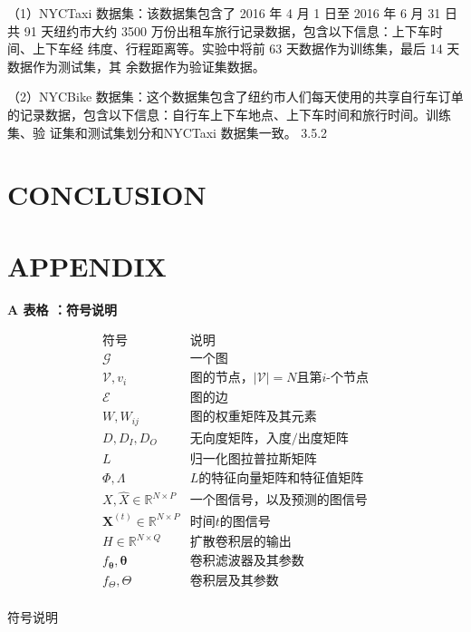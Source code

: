 \documentclass[10.5pt,compsoc,UTF8]{CjC}
\theoremstyle{mystyle}
\begin{document}
（1）NYCTaxi 数据集：该数据集包含了 2016 年 4 月 1 日至 2016 年 6 月 31 日共 91
天纽约市大约 3500 万份出租车旅行记录数据，包含以下信息：上下车时间、上下车经 纬度、行程距离等。实验中将前 63 天数据作为训练集，最后 14 天数据作为测试集，其 余数据作为验证集数据。 

（2）NYCBike 数据集：这个数据集包含了纽约市人们每天使用的共享自行车订单
的记录数据，包含以下信息：自行车上下车地点、上下车时间和旅行时间。训练集、验 证集和测试集划分和NYCTaxi 数据集一致。
3.5.2




\section{CONCLUSION}


\section{APPENDIX}

\textbf{ A 表格 ：符号说明 }\\
\begin{table}[h]
	\centering
	\[
	\begin{array}{l|l}
		\text{符号} & \text{说明} \\
		\hline \hline
		\mathcal{G} & \text{一个图} \\
		\mathcal{V}, v_{i} & \text{图的节点，}|\mathcal{V}| = N \text{且第} i \text{-个节点} \\
		\mathcal{E} & \text{图的边} \\
		W, W_{i j} & \text{图的权重矩阵及其元素} \\
		D, D_{I}, D_{O} & \text{无向度矩阵，入度/出度矩阵} \\
		L & \text{归一化图拉普拉斯矩阵} \\
		\Phi, \Lambda & L\text{的特征向量矩阵和特征值矩阵} \\
		X, \hat{X} \in \mathbb{R}^{N \times P} & \text{一个图信号，以及预测的图信号} \\
		\boldsymbol{X}^{(t)} \in \mathbb{R}^{N \times P} & \text{时间} t \text{的图信号} \\
		H \in \mathbb{R}^{N \times Q} & \text{扩散卷积层的输出} \\
		f_{\boldsymbol{\theta}}, \boldsymbol{\theta} & \text{卷积滤波器及其参数} \\
		f_{\Theta}, \Theta & \text{卷积层及其参数} \\
	\end{array}
	\]
	\caption{符号说明}
\end{table}
\end{document}
